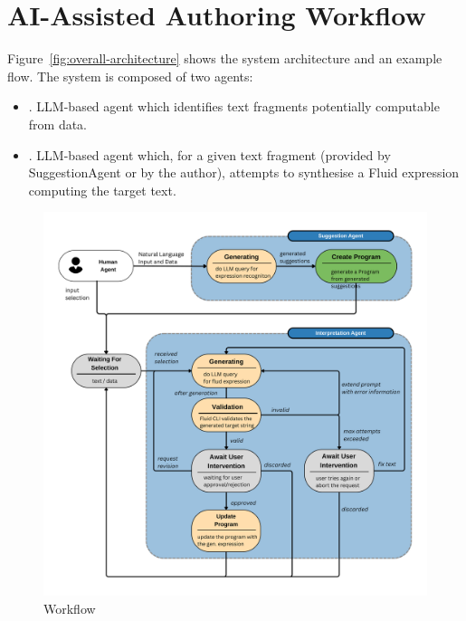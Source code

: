 \section{AI-Assisted Authoring Workflow}
\label{sec:authoring-workflow}

Figure~\ref{fig:overall-architecture} shows the system architecture and an example flow.
The system is composed of two agents:

\begin{itemize}
    \item \textbf{\SuggestionAgent}. LLM-based agent which identifies text fragments potentially computable from data.
    \item \textbf{\InterpretationAgent}. LLM-based agent which, for a given text fragment (provided by
    SuggestionAgent or by the author), attempts to synthesise a Fluid expression computing the target text.
\end{itemize}

\begin{figure}
    \centering
    \includegraphics[width=\linewidth]{fig/entire-workflow}
    \caption{Workflow}\label{fig:architecture}
\end{figure}

